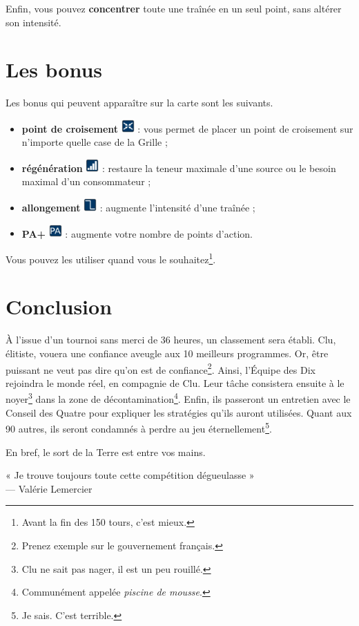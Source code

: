 Enfin, vous pouvez \textbf{concentrer} toute une traînée en un seul point, sans altérer son intensité.

\newpage
\section{Les bonus}\label{bonus}

Les bonus qui peuvent apparaître sur la carte sont les suivants.
\begin{itemize}
\item \textbf{point de croisement} \includegraphics[width=5mm]{../data/graphics/bonus-bonus_croisement.png} : vous permet de placer un point de croisement sur n'importe quelle case de la Grille ;
\item \textbf{régénération} \includegraphics[width=5mm]{../data/graphics/bonus-bonus_regeneration.png} : restaure la teneur maximale d'une source ou le besoin maximal d'un consommateur ;
\item \textbf{allongement} \includegraphics[width=5mm]{../data/graphics/bonus-plus_long.png} : augmente l'intensité d'une traînée ;
\item \textbf{PA+} \includegraphics[width=5mm]{../data/graphics/bonus-plus_pa.png} : augmente votre nombre de points d'action.
\end{itemize}\bigskip

Vous pouvez les utiliser quand vous le souhaitez\footnote{Avant la fin des 150 tours, c'est mieux.}.

\section{Conclusion}


À l'issue d'un tournoi sans merci de 36 heures, un classement sera établi. Clu, élitiste, vouera une confiance aveugle aux 10 meilleurs programmes. Or, être puissant ne veut pas dire qu'on est de confiance\footnote{Prenez exemple sur le gouvernement français.}. Ainsi, l'Équipe des Dix rejoindra le monde réel, en compagnie de Clu. Leur tâche consistera ensuite à le noyer\footnote{Clu ne sait pas nager, il est un peu rouillé.} dans la zone de décontamination\footnote{Communément appelée \emph{piscine de mousse}.}. Enfin, ils passeront un entretien avec le Conseil des Quatre pour expliquer les stratégies qu'ils auront utilisées. Quant aux 90 autres, ils seront condamnés à perdre au jeu éternellement\footnote{Je sais. C'est terrible.}.

En bref, le sort de la Terre est entre vos mains.

\vspace{5cm}

\noindent
« Je trouve toujours toute cette compétition dégueulasse »\\
— Valérie Lemercier